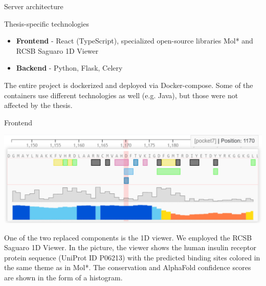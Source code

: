 \documentclass[portrait,a0paper,fontscale=0.25]{baposter}
\begin{document}
\begin{poster}
\begin{posterbox}[column=0, name=architecture, below=goals]{Server architecture}
\end{posterbox}

\begin{posterbox}[column=0, name=tech, below=architecture, headerColorOne=yellow!80!orange!95!black, boxColorOne=yellow!33]{Thesis-specific technologies}
\begin{itemize}
	\item \textbf{Frontend} - React (TypeScript), specialized open-source libraries Mol* and RCSB Saguaro 1D Viewer
	\item \textbf{Backend} - Python, Flask, Celery
\end{itemize}
The entire project is dockerized and deployed via Docker-compose. Some of the containers use different technologies as well (e.g. Java), but those were not affected by the thesis.
\end{posterbox}

%
%


%
%
%

\begin{posterbox}[column=1, name=result1]{Frontend}
\begin{center}
	\includegraphics[width=0.8\linewidth]{img/1D.pdf}
\end{center}

One of the two replaced components is the 1D viewer. We employed the RCSB Saguaro 1D Viewer.
In the picture, the viewer shows the human insulin receptor protein sequence (UniProt ID P06213) with the predicted binding sites colored in the same theme as in Mol*.
The conservation and AlphaFold confidence scores are shown in the form of a histogram.


\end{posterbox}
\end{poster}
\end{document}

